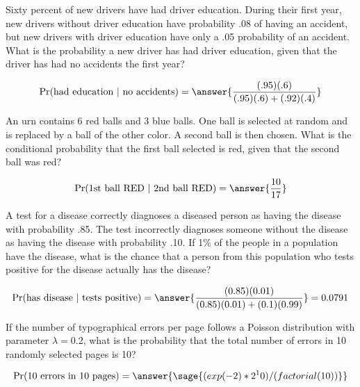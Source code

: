 \documentclass{ximera}
\begin{document}
\begin{problem}
Sixty percent of new drivers have had driver education. During their first year, new drivers without driver education have probability .08 of having an accident, but new drivers with driver education have only a .05 probability of an accident. What is the probability a new driver has had driver education, given that the driver has had no accidents the first year? 

\begin{prompt}
$$\Pr(\text{had education }|\text{ no accidents})=\answer{\frac{(.95)(.6)}{(.95)(.6)+(.92)(.4)}}$$
\end{prompt}
\end{problem}


\begin{problem}
An urn contains 6 red balls and 3 blue balls. One ball is selected at random and is replaced by a ball of the other color. A second ball is then chosen. What is the conditional probability that the first ball selected is red, given that the second ball was red? 

\begin{prompt}
$$\Pr(\text{1st ball RED }|\text{ 2nd ball RED})=\answer{\frac{10}{17}}$$

\end{prompt}
\end{problem}



\begin{problem}
 A test for a disease correctly diagnoses a diseased person as having the disease with probability .85. The test incorrectly diagnoses someone without the disease as having the disease with probability .10. If 1\% of the people in a population have the disease, what is the chance that a person from this population who tests positive for the disease actually has the disease? 

\begin{prompt}
$$\Pr(\text{has disease }|\text{ tests positive})=\answer{ \frac{(0.85)(0.01)}{(0.85)(0.01)+(0.1)(0.99)}}=0.0791$$
\end{prompt}
\end{problem}


\begin{problem}

If the number of typographical errors per page follows a Poisson distribution with parameter $\lambda=0.2$, what is the probability that the total number of errors in 10 randomly selected pages is 10? 

\begin{prompt}
$$\Pr(\text{10 errors in 10 pages})= \answer{\sage{(exp(-2)*2^10)/(factorial(10))}}$$
\end{prompt}
\end{problem}
\end{document}
